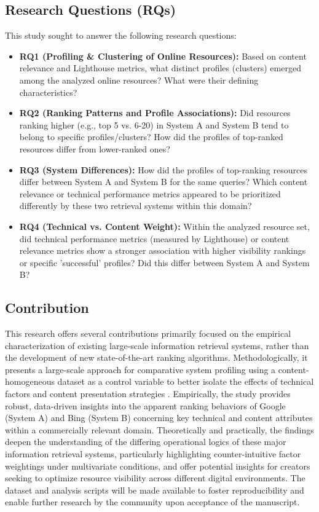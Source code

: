 \documentclass[a4paper,fleqn]{cas-sc}
\begin{document}
\subsection{Research Questions (RQs)}
\label{subsec:rqs}
This study sought to answer the following research questions:
\begin{itemize}
\item \textbf{RQ1 (Profiling \& Clustering of Online Resources):} Based on content relevance and Lighthouse metrics, what distinct profiles (clusters) emerged among the analyzed online resources? What were their defining characteristics?
\item \textbf{RQ2 (Ranking Patterns and Profile Associations):} Did resources ranking higher (e.g., top 5 vs. 6-20) in System A and System B tend to belong to specific profiles/clusters? How did the profiles of top-ranked resources differ from lower-ranked ones?
\item \textbf{RQ3 (System Differences):} How did the profiles of top-ranking resources differ between System A and System B for the same queries? Which content relevance or technical performance metrics appeared to be prioritized differently by these two retrieval systems within this domain?
\item \textbf{RQ4 (Technical vs. Content Weight):} Within the analyzed resource set, did technical performance metrics (measured by Lighthouse) or content relevance metrics show a stronger association with higher visibility rankings or specific 'successful' profiles? Did this differ between System A and System B?
\end{itemize}

\subsection{Contribution}
\label{subsec:contribution}
This research offers several contributions primarily focused on the empirical characterization of existing large-scale information retrieval systems, rather than the development of new state-of-the-art ranking algorithms. Methodologically, it presents a large-scale approach for comparative system profiling using a content-homogeneous dataset as a control variable to better isolate the effects of technical factors and content presentation strategies \citep{Jayaraman2022, Sezerrakolu2024}. Empirically, the study provides robust, data-driven insights into the apparent ranking behaviors of Google (System A) and Bing (System B) concerning key technical and content attributes within a commercially relevant domain. Theoretically and practically, the findings deepen the understanding of the differing operational logics of these major information retrieval systems, particularly highlighting counter-intuitive factor weightings under multivariate conditions, and offer potential insights for creators seeking to optimize resource visibility across different digital environments. The dataset and analysis scripts will be made available to foster reproducibility and enable further research by the community upon acceptance of the manuscript.
\end{document}
